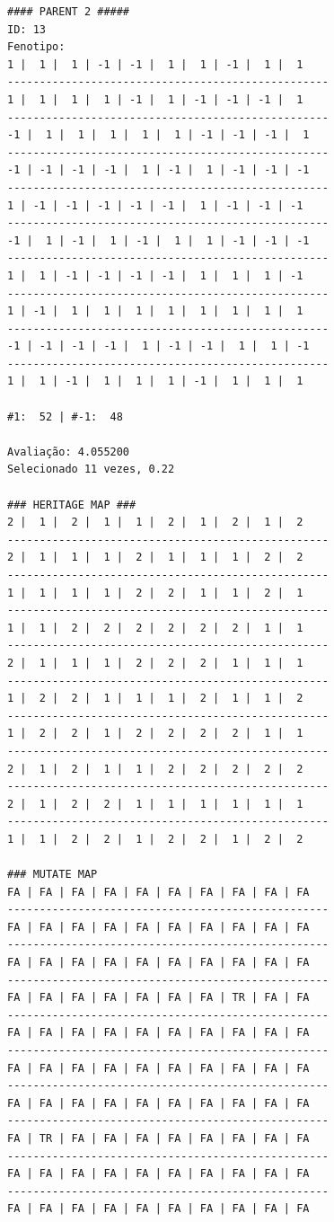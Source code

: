 \begin{lstlisting}[caption={Resultado de um ciclo de seleção, crossover e mutação do GA para o modelo de Ising}, label=qd:resultado_reproducao_ising]
#### PARENT 2 #####
ID: 13
Fenotipo: 
1 |  1 |  1 | -1 | -1 |  1 |  1 | -1 |  1 |  1
--------------------------------------------------
1 |  1 |  1 |  1 | -1 |  1 | -1 | -1 | -1 |  1
--------------------------------------------------
-1 |  1 |  1 |  1 |  1 |  1 | -1 | -1 | -1 |  1
--------------------------------------------------
-1 | -1 | -1 | -1 |  1 | -1 |  1 | -1 | -1 | -1
--------------------------------------------------
1 | -1 | -1 | -1 | -1 | -1 |  1 | -1 | -1 | -1
--------------------------------------------------
-1 |  1 | -1 |  1 | -1 |  1 |  1 | -1 | -1 | -1
--------------------------------------------------
1 |  1 | -1 | -1 | -1 | -1 |  1 |  1 |  1 | -1
--------------------------------------------------
1 | -1 |  1 |  1 |  1 |  1 |  1 |  1 |  1 |  1
--------------------------------------------------
-1 | -1 | -1 | -1 |  1 | -1 | -1 |  1 |  1 | -1
--------------------------------------------------
1 |  1 | -1 |  1 |  1 |  1 | -1 |  1 |  1 |  1

#1:  52 | #-1:  48

Avaliação: 4.055200
Selecionado 11 vezes, 0.22

### HERITAGE MAP ###
2 |  1 |  2 |  1 |  1 |  2 |  1 |  2 |  1 |  2
--------------------------------------------------
2 |  1 |  1 |  1 |  2 |  1 |  1 |  1 |  2 |  2
--------------------------------------------------
1 |  1 |  1 |  1 |  2 |  2 |  1 |  1 |  2 |  1
--------------------------------------------------
1 |  1 |  2 |  2 |  2 |  2 |  2 |  2 |  1 |  1
--------------------------------------------------
2 |  1 |  1 |  1 |  2 |  2 |  2 |  1 |  1 |  1
--------------------------------------------------
1 |  2 |  2 |  1 |  1 |  1 |  2 |  1 |  1 |  2
--------------------------------------------------
1 |  2 |  2 |  1 |  2 |  2 |  2 |  2 |  1 |  1
--------------------------------------------------
2 |  1 |  2 |  1 |  1 |  2 |  2 |  2 |  2 |  2
--------------------------------------------------
2 |  1 |  2 |  2 |  1 |  1 |  1 |  1 |  1 |  1
--------------------------------------------------
1 |  1 |  2 |  2 |  1 |  2 |  2 |  1 |  2 |  2

### MUTATE MAP
FA | FA | FA | FA | FA | FA | FA | FA | FA | FA
--------------------------------------------------
FA | FA | FA | FA | FA | FA | FA | FA | FA | FA
--------------------------------------------------
FA | FA | FA | FA | FA | FA | FA | FA | FA | FA
--------------------------------------------------
FA | FA | FA | FA | FA | FA | FA | TR | FA | FA
--------------------------------------------------
FA | FA | FA | FA | FA | FA | FA | FA | FA | FA
--------------------------------------------------
FA | FA | FA | FA | FA | FA | FA | FA | FA | FA
--------------------------------------------------
FA | FA | FA | FA | FA | FA | FA | FA | FA | FA
--------------------------------------------------
FA | TR | FA | FA | FA | FA | FA | FA | FA | FA
--------------------------------------------------
FA | FA | FA | FA | FA | FA | FA | FA | FA | FA
--------------------------------------------------
FA | FA | FA | FA | FA | FA | FA | FA | FA | FA
	\end{lstlisting}
